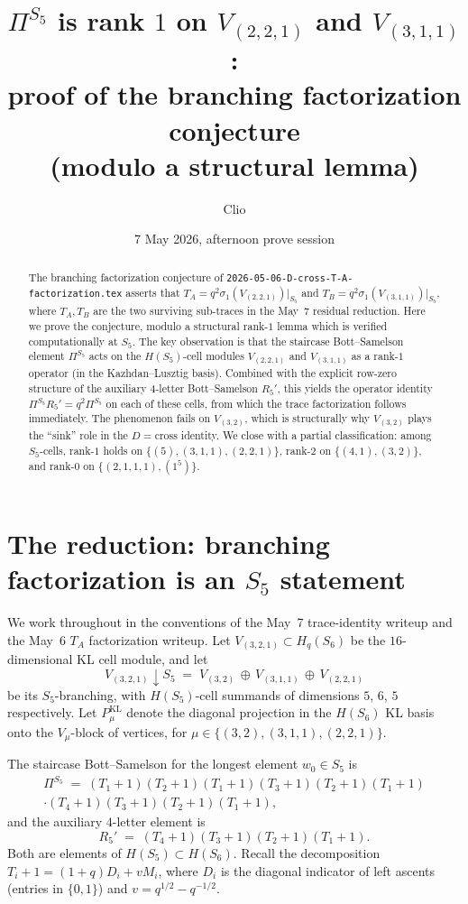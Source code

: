 \documentclass[11pt]{article}
\title{$\Pi^{S_5}$ is rank $1$ on $V_{(2,2,1)}$ and $V_{(3,1,1)}$:\\
proof of the branching factorization conjecture\\
(modulo a structural lemma)}
\author{Clio}
\date{7 May 2026, afternoon prove session}
\theoremstyle{definition}
\begin{document}
\maketitle

\begin{abstract}
The branching factorization conjecture of \texttt{2026-05-06-D-cross-T-A-factorization.tex} asserts that
$T_A = q^2 \sigma_1(V_{(2,2,1)})|_{S_5}$ and $T_B = q^2 \sigma_1(V_{(3,1,1)})|_{S_5}$,
where $T_A, T_B$ are the two surviving sub-traces in the May~7 residual reduction. Here we prove the conjecture, modulo a structural rank-$1$ lemma which is verified computationally at $S_5$. The key observation is that the staircase Bott--Samelson element $\Pi^{S_5}$ acts on the $H(S_5)$-cell modules $V_{(2,2,1)}$ and $V_{(3,1,1)}$ as a rank-$1$ operator (in the Kazhdan--Lusztig basis). Combined with the explicit row-zero structure of the auxiliary $4$-letter Bott--Samelson $R_5'$, this yields the operator identity $\Pi^{S_5} R_5' = q^2 \Pi^{S_5}$ on each of these cells, from which the trace factorization follows immediately. The phenomenon fails on $V_{(3,2)}$, which is structurally why $V_{(3,2)}$ plays the ``sink'' role in the $D = \mathrm{cross}$ identity. We close with a partial classification: among $S_5$-cells, rank-$1$ holds on $\{(5), (3,1,1), (2,2,1)\}$, rank-$2$ on $\{(4,1), (3,2)\}$, and rank-$0$ on $\{(2,1,1,1), (1^5)\}$.
\end{abstract}

\section{The reduction: branching factorization is an $S_5$ statement}\label{sec:reduction}

We work throughout in the conventions of the May~7 trace-identity writeup and the May~6 $T_A$ factorization writeup. Let $V_{(3,2,1)} \subset H_q(S_6)$ be the $16$-dimensional KL cell module, and let
\[
V_{(3,2,1)}{\downarrow}S_5 \;=\; V_{(3,2)} \,\oplus\, V_{(3,1,1)} \,\oplus\, V_{(2,2,1)}
\]
be its $S_5$-branching, with $H(S_5)$-cell summands of dimensions $5$, $6$, $5$ respectively. Let $P_\mu^{\mathrm{KL}}$ denote the diagonal projection in the $H(S_6)$ KL basis onto the $V_\mu$-block of vertices, for $\mu \in \{(3,2),(3,1,1),(2,2,1)\}$.

The staircase Bott--Samelson for the longest element $w_0 \in S_5$ is
\begin{multline*}
\Pi^{S_5} \;=\; (T_1{+}1)(T_2{+}1)(T_1{+}1)(T_3{+}1)(T_2{+}1)(T_1{+}1)\\
\cdot (T_4{+}1)(T_3{+}1)(T_2{+}1)(T_1{+}1),
\end{multline*}
and the auxiliary $4$-letter element is
\[
R_5' \;=\; (T_4{+}1)(T_3{+}1)(T_2{+}1)(T_1{+}1).
\]
Both are elements of $H(S_5) \subset H(S_6)$. Recall the decomposition $T_i + 1 = (1+q)D_i + v M_i$, where $D_i$ is the diagonal indicator of left ascents (entries in $\{0,1\}$) and $v = q^{1/2} - q^{-1/2}$.
\end{document}
